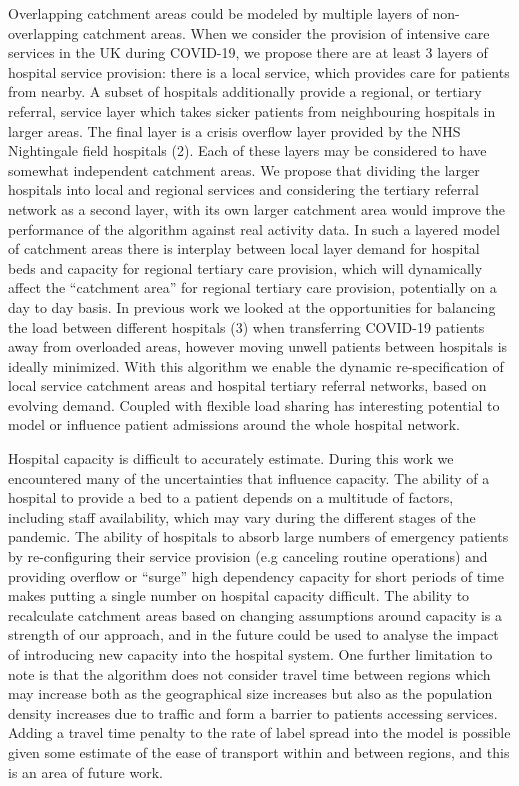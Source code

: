 \documentclass[
]{article}
\begin{document}
Overlapping catchment areas could be modeled by multiple layers of
non-overlapping catchment areas. When we consider the provision of
intensive care services in the UK during COVID-19, we propose there are
at least 3 layers of hospital service provision: there is a local
service, which provides care for patients from nearby. A subset of
hospitals additionally provide a regional, or tertiary referral, service
layer which takes sicker patients from neighbouring hospitals in larger
areas. The final layer is a crisis overflow layer provided by the NHS
Nightingale field hospitals (2). Each of these layers may be considered
to have somewhat independent catchment areas. We propose that dividing
the larger hospitals into local and regional services and considering
the tertiary referral network as a second layer, with its own larger
catchment area would improve the performance of the algorithm against
real activity data. In such a layered model of catchment areas there is
interplay between local layer demand for hospital beds and capacity for
regional tertiary care provision, which will dynamically affect the
``catchment area'' for regional tertiary care provision, potentially on
a day to day basis. In previous work we looked at the opportunities for
balancing the load between different hospitals (3) when transferring
COVID-19 patients away from overloaded areas, however moving unwell
patients between hospitals is ideally minimized. With this algorithm we
enable the dynamic re-specification of local service catchment areas and
hospital tertiary referral networks, based on evolving demand. Coupled
with flexible load sharing has interesting potential to model or
influence patient admissions around the whole hospital network.

Hospital capacity is difficult to accurately estimate. During this work
we encountered many of the uncertainties that influence capacity. The
ability of a hospital to provide a bed to a patient depends on a
multitude of factors, including staff availability, which may vary
during the different stages of the pandemic. The ability of hospitals to
absorb large numbers of emergency patients by re-configuring their
service provision (e.g canceling routine operations) and providing
overflow or ``surge'' high dependency capacity for short periods of time
makes putting a single number on hospital capacity difficult. The
ability to recalculate catchment areas based on changing assumptions
around capacity is a strength of our approach, and in the future could
be used to analyse the impact of introducing new capacity into the
hospital system. One further limitation to note is that the algorithm
does not consider travel time between regions which may increase both as
the geographical size increases but also as the population density
increases due to traffic and form a barrier to patients accessing
services. Adding a travel time penalty to the rate of label spread into
the model is possible given some estimate of the ease of transport
within and between regions, and this is an area of future work.
\end{document}
